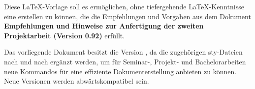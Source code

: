 Diese \LaTeX{}-Vorlage soll es erm\"oglichen, ohne tiefergehende \LaTeX-Kenntnisse 
eine \seArbeit{} erstellen zu k\"onnen, die die Empfehlungen und Vorgaben aus dem 
Dokument \textbf{Empfehlungen und Hinweise zur Anfertigung der zweiten Projektarbeit (Version 0.92)}
erf\"ullt. 

Das vorliegende Dokument besitzt die Version \version, da die zugeh\"origen sty-Dateien 
nach und nach erg\"anzt werden, um f\"ur Seminar-, Projekt- und Bachelorarbeiten neue 
Kommandos f\"ur eine effiziente Dokumenterstellung anbieten zu k\"onnen. 
Neue Versionen werden abw\"artskompatibel sein. 
